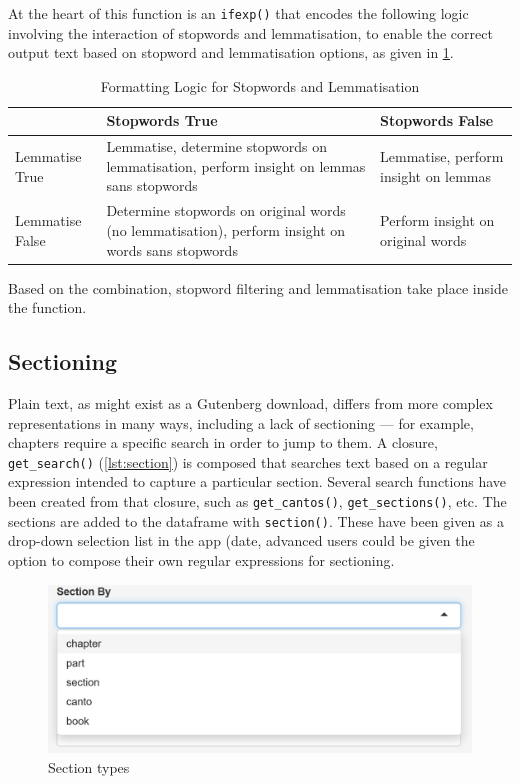 \documentclass[11pt, a4paper, titlepage]{report}
\begin{document}
At the heart of this function is an \texttt{ifexp()} that
encodes the following logic involving the interaction of stopwords and
lemmatisation, to enable the correct output text based on stopword and
lemmatisation options, as given in \underline{\cref{tab:formatting}}.

\begin{table}[h]
  \centering
  \begin{tabular}{p{20mm}|p{50mm}p{50mm}}
    & Stopwords True                                                                                    & Stopwords False                      \\
    \toprule
    Lemmatise True  & Lemmatise, determine stopwords on lemmatisation, perform insight on lemmas sans stopwords         & Lemmatise, perform insight on lemmas \\
    Lemmatise False & Determine stopwords on original words (no lemmatisation), perform insight on words sans stopwords & Perform insight on original words    \\
  \end{tabular}
  \caption{Formatting Logic for Stopwords and
    Lemmatisation}\label{tab:formatting}
\end{table}

Based on the combination, stopword filtering and lemmatisation take
place inside the function.

\subsection{Sectioning}

Plain text, as might exist as a Gutenberg download, differs from more
complex representations in many ways, including a lack of sectioning
--- for example, chapters require a specific search in order to jump
to them. A closure, \texttt{get_search()}
(\underline{\cref{lst:section}}) is composed that searches text based
on a regular expression intended to capture a particular section.
Several search functions have been created from that closure, such as
\texttt{get_cantos()}, \texttt{get_sections()}, etc. The
sections are added to the dataframe with \texttt{section()}.
These have been given as a drop-down selection list in the app (date,
advanced users could be given the option to compose their own regular
expressions for sectioning.

\begin{figure}
  \centering \includegraphics[scale=0.7]{processing-section.png}
  \caption{Section types\label{fig:processing-section}}
\end{figure}
\end{document}
